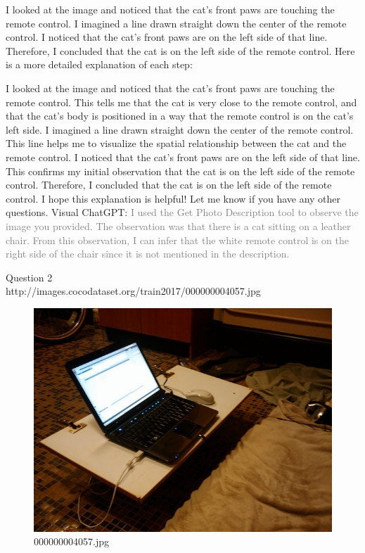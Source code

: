\begin{enumerate}
        I looked at the image and noticed that the cat's front paws are touching the remote control.
        I imagined a line drawn straight down the center of the remote control.
        I noticed that the cat's front paws are on the left side of that line.
        Therefore, I concluded that the cat is on the left side of the remote control.
        Here is a more detailed explanation of each step:

        I looked at the image and noticed that the cat's front paws are touching the remote control. This tells me that the cat is very close to the remote control, and that the cat's body is positioned in a way that the remote control is on the cat's left side.
        I imagined a line drawn straight down the center of the remote control. This line helps me to visualize the spatial relationship between the cat and the remote control.
        I noticed that the cat's front paws are on the left side of that line. This confirms my initial observation that the cat is on the left side of the remote control.
        Therefore, I concluded that the cat is on the left side of the remote control.
        I hope this explanation is helpful! Let me know if you have any other questions.
        \subitem Visual ChatGPT: \textcolor{gray}{I used the Get Photo Description tool to observe the image you provided. The observation was that there is a cat sitting on a leather chair. From this observation, I can infer that the white remote control is on the right side of the chair since it is not mentioned in the description.}
    \end{enumerate}
Question 2\\
http://images.cocodataset.org/train2017/000000004057.jpg
    \begin{figure}[h]
        \centering
        \includegraphics[width=0.8\linewidth]{../image set/easy/000000004057.jpg}
        \caption{000000004057.jpg}
    \end{figure}
